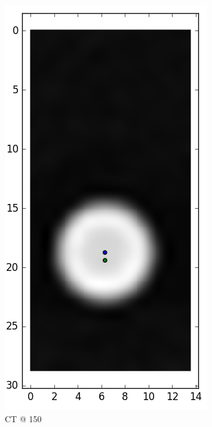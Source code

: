 \documentclass[parskip,bibtotoc,final,twoside=false,titlepage,a4paper,english,12pt,titlepage,a4paper]{scrbook}
\begin{document}
\begin{figure}[!tbp]
\begin{subfigure}[b]{0.32\textwidth}
  \end{subfigure}
  \begin{subfigure}[b]{0.32\textwidth}
    \includegraphics[scale=0.55]{python/centroid/CT_x100@150_centroids.png}
    \caption{CT @ 150}
    \label{fig:CT_x100_centroids@150}
  \end{subfigure}
  \begin{subfigure}[b]{0.32\textwidth}

\end{subfigure}
\end{figure}
\end{document}
